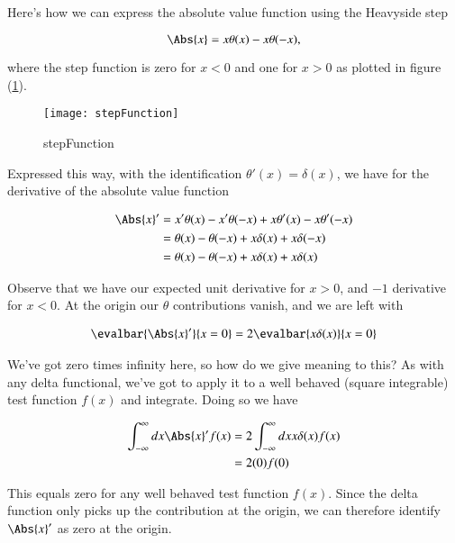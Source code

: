 Here's how we can express the absolute value function using the Heavyside step

\begin{equation}\label{eqn:variationHarmonicOscillator:330}
\Abs{x} = x \theta(x) - x \theta(-x),
\end{equation}

where the step function is zero for $x < 0$ and one for $x > 0$ as plotted in figure (\ref{fig:stepFunction}).

\begin{figure}[htp]
\centering
\texttt{[image: stepFunction]}
\caption{stepFunction}\label{fig:stepFunction}
\end{figure}

Expressed this way, with the identification $\theta'(x) = \delta(x)$, we have for the derivative of the absolute value function

\begin{align*}
\Abs{x}' 
&= x' \theta(x) - x' \theta(-x) + x \theta'(x) - x \theta'(-x) \\
&= \theta(x) - \theta(-x) + x \delta(x) + x \delta(-x) \\
&= \theta(x) - \theta(-x) + x \delta(x) + x \delta(x) \\
\end{align*}

Observe that we have our expected unit derivative for $x > 0$, and $-1$ derivative for $x < 0$.  At the origin our $\theta$ contributions vanish, and we are left with

\begin{align*}
\evalbar{\Abs{x}' }{x=0}
= 2 \evalbar{x \delta(x)}{x=0} \\
\end{align*}

We've got zero times infinity here, so how do we give meaning to this?  As with any delta functional, we've got to apply it to a well behaved (square integrable) test function $f(x)$ and integrate.  Doing so we have

\begin{align*}
\int_{-\infty}^\infty dx \Abs{x}' f(x) 
&= 2 \int_{-\infty}^\infty dx x \delta(x) f(x) \\
&= 2 (0) f(0)
\end{align*}

This equals zero for any well behaved test function $f(x)$.  Since the delta function only picks up the contribution at the origin, we can therefore identify $\Abs{x}'$ as zero at the origin.

